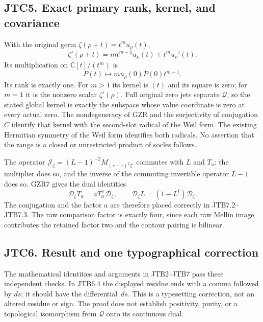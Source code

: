 \subsection{JTC5. Exact primary rank, kernel, and
covariance}\label{jtc5.-exact-primary-rank-kernel-and-covariance}

With the original germ \(\zeta(\rho+t)=t^mu_\rho(t)\), \[
\zeta'(\rho+t)=mt^{m-1}u_\rho(t)+t^mu_\rho'(t).
\] Its multiplication on \(\mathbb C[t]/(t^m)\) is \[
P(t)\longmapsto m u_\rho(0)P(0)t^{m-1}.
\] Its rank is exactly one. For \(m>1\) its kernel is \((t)\) and its
square is zero; for \(m=1\) it is the nonzero scalar \(\zeta'(\rho)\).
Full original zero jets separate \(\mathcal Q\), so the stated global
kernel is exactly the subspace whose value coordinate is zero at every
actual zero. The nondegeneracy of GZR and the surjectivity of
conjugation \(C\) identify that kernel with the second-slot radical of
the Weil form. The existing Hermitian symmetry of the Weil form
identifies both radicals. No assertion that the range is a closed or
unrestricted product of socles follows.

The operator \(\mathcal J_\zeta=(L-1)^{-2}M_{(s-1)^2\zeta'}\) commutes
with \(L\) and \(T_a\): the multiplier does so, and the inverse of the
commuting invertible operator \(L-1\) does so. GZR7 gives the dual
identities \[
\mathscr D_\zeta T_a=aT_a^\vee\mathscr D_\zeta,\qquad
\mathscr D_\zeta L=(1-L^t)\mathscr D_\zeta.
\] The conjugation and the factor \(a\) are therefore placed correctly
in JTB7.2--JTB7.3. The raw comparison factor is exactly four, since each
raw Mellin image contributes the retained factor two and the contour
pairing is bilinear.

\subsection{JTC6. Result and one typographical
correction}\label{jtc6.-result-and-one-typographical-correction}

The mathematical identities and arguments in JTB2--JTB7 pass these
independent checks. In JTB6.4 the displayed residue ends with a comma
followed by \(ds\); it should have the differential \(\,ds\). This is a
typesetting correction, not an altered residue or sign. The proof does
not establish positivity, purity, or a topological isomorphism from
\(\mathcal Q\) onto its continuous dual.
